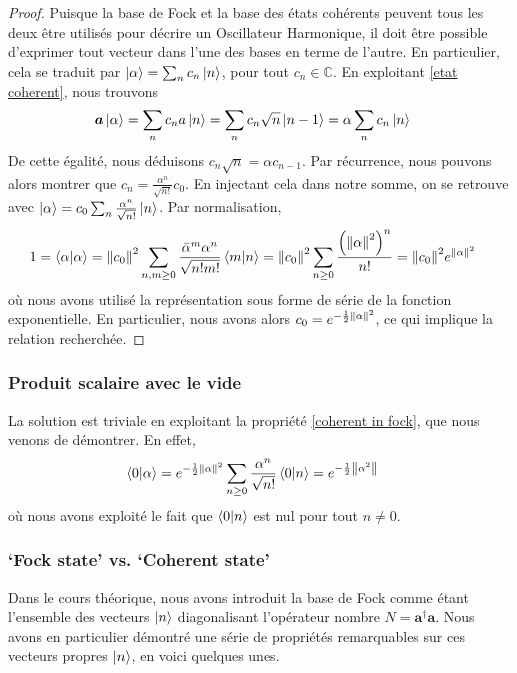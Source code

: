 \documentclass[11pt,oneside,a4paper]{article}
\begin{document}
\begin{proof}
  Puisque la base de Fock et la base des états cohérents peuvent tous les deux être utilisés pour décrire un Oscillateur Harmonique, il doit être possible d'exprimer tout vecteur dans l'une des bases en terme de l'autre. En particulier, cela se traduit par $\ket{\alpha} = \sum_n c_n \ket{n}$, pour tout $c_n\in\mathbb{C}$. En exploitant \eqref{etat coherent}, nous trouvons
  \begin{align}
    \bm{a}\ket{\alpha} = \sum_n c_n a\ket{n} = \sum_n c_n\sqrt{n}\ket{n-1} &= \alpha\sum_n c_n \ket{n}
  \end{align}
  De cette égalité, nous déduisons $c_n\sqrt{n}=\alpha c_{n-1}$. Par récurrence, nous pouvons alors montrer que $c_n = \frac{\alpha^n}{\sqrt{n!}}c_0$. En injectant cela dans notre somme, on se retrouve avec $\ket{\alpha} = c_0\sum_n \frac{\alpha^n}{\sqrt{n!}}\ket{n}$. Par normalisation,
  \begin{align}
    1 = \braket{\alpha} &= \norm{c_0}^2 \sum_{n,m\geq 0} \frac{\bar{\alpha}^m\alpha^n}{\sqrt{n!m!}}\braket{m}{n} = \norm{c_0}^2\sum_{n\geq 0} \frac{\left(\norm{\alpha}^2\right)^n}{n!} = \norm{c_0}^2e^{\norm{\alpha}^2}
  \end{align}
  où nous avons utilisé la représentation sous forme de série de la fonction exponentielle. En particulier, nous avons alors $c_0 = e^{-\frac{1}{2}\norm{\alpha}^2}$, ce qui implique la relation recherchée.
\end{proof}

\subsubsection{Produit scalaire avec le vide}
\label{intégrale gaussienne}

La solution est triviale en exploitant la propriété \ref{coherent in fock}, que nous venons de démontrer. En effet,
\begin{align}
  \braket{0}{\alpha} &= e^{-\frac{1}{2}\norm{\alpha}^2}\sum_{n\geq 0}\frac{\alpha^n}{\sqrt{n!}}\braket{0}{n} = e^{-\frac{1}{2}\norm{\alpha^2}}
\end{align}
où nous avons exploité le fait que $\braket{0}{n}$ est nul pour tout $n\neq 0$.

\subsubsection{`Fock state' vs. `Coherent state'}\label{sec:fock vs. coherent}
Dans le cours théorique, nous avons introduit la base de Fock comme étant l'ensemble des vecteurs $\ket{n}$ diagonalisant l'opérateur nombre $N=\bm{a}^\dagger \bm{a}$. Nous avons en particulier démontré une série de propriétés remarquables sur ces vecteurs propres $\ket{n}$, en voici quelques unes.
\end{document}
